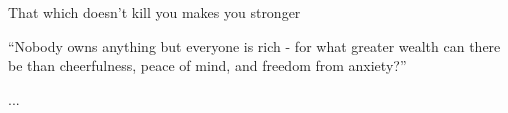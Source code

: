 \begin{dedication}
That which doesn't kill you makes you stronger
\end{dedication}

\begin{acknowledgements}
“Nobody owns anything but everyone is rich - for what greater wealth can there be than cheerfulness, peace of mind, and freedom from anxiety?”
\end{acknowledgements}

\tableofcontents
\listoftables				%
\listoffigures				%

\begin{thesislist}{...}		%
\end{thesislist}

\mainmatter

\endinput
